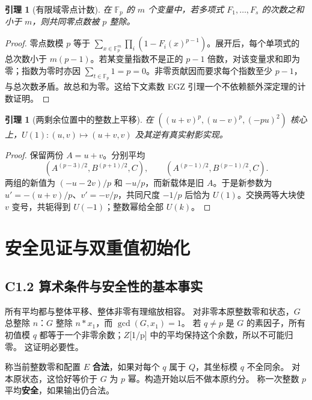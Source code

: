 \documentclass[11pt,a4paper]{article}
\newcommand{\FF}{\mathbb F}
\newtheorem{lemma}[theorem]{引理}
\theoremstyle{definition}
\numberwithin{equation}{section}
\begin{document}
\begin{lemma}[有限域零点计数]
在 $\FF_p$ 的 $m$ 个变量中，若多项式 $F_1,\ldots,F_s$ 的次数之和小于 $m$，则共同零点数被 $p$ 整除。
\end{lemma}
\begin{proof}
零点数模 $p$ 等于 $\sum_{x\in\FF_p^m}\prod_i(1-F_i(x)^{p-1})$。展开后，每个单项式的总次数小于 $m(p-1)$。若某变量指数不是正的 $p-1$ 倍数，对该变量求和即为零；指数为零时亦因 $\sum_{t\in\FF_p}1=p=0$。非零贡献因而要求每个指数至少 $p-1$，与总次数矛盾。故总和为零。这给下文素数 EGZ 引理一个不依赖额外深定理的计数证明。
\end{proof}

\begin{lemma}[两剩余位置中的整数上平移]
在 $((u+v)^p,(u-v)^p,(-pu)^2)$ 核心上，$U(1):(u,v)\mapsto(u+v,v)$ 及其逆有真实射影实现。
\end{lemma}
\begin{proof}
保留两份 $A=u+v$。分别平均
\[
(A^{(p-3)/2},B^{(p+1)/2},C),\qquad
(A^{(p-1)/2},B^{(p-1)/2},C).
\]
两组的新值为 $(-u-2v)/p$ 和 $-u/p$，而新载体是旧 $A$。于是新参数为 $u'=-(u+v)/p$、$v'=-v/p$，共同尺度 $-1/p$ 后恰为 $U(1)$。交换两等大块使 $v$ 变号，共轭得到 $U(-1)$；整数幂给全部 $U(k)$。
\end{proof}


\section{安全见证与双重值初始化}\label{construct:safety}
\subsection*{\texorpdfstring{{C1.2} {算术条件与安全性的基本事实}}{C1.2 算术条件与安全性的基本事实}}\label{C1-h1}

{所有平均都与整体平移、整体非零有理缩放相容。} {对非零本原整数零和状态，\ensuremath{G}} {总整除} {\ensuremath{n}：\ensuremath{G}} {整除} {\ensuremath{n*x_{1}}，而} {\ensuremath{\operatorname{gcd}(G,x_{1})=1}。} {若} {\ensuremath{q\ne p}} {是} {\ensuremath{G}} {的素因子，所有初值模} {\ensuremath{q}} {都等于一个非零余数；\ensuremath{Z}{[}1/p{]}} {中的平均保持这个余数，所以不可能归零。} {这证明必要性。}

{称当前整数零和配置} {\ensuremath{E}} \textbf{{合法}}{，如果对每个} {\ensuremath{q}} {属于} {\ensuremath{Q}，其坐标模} {\ensuremath{q}} {不全同余。} {对本原状态，这恰好等价于} {\ensuremath{G}} {为} {\ensuremath{p}} {幂。构造开始以后不做本原约分。} {称一次整数} {\ensuremath{p}} {平均}\textbf{{安全}}{，如果输出仍合法。}
\end{document}
